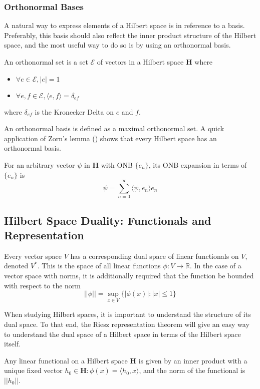 \subsubsection{Orthonormal Bases}
A natural way to express elements of a Hilbert space is in reference to a basis.
Preferably, this basis should also reflect the inner product structure of the
Hilbert space, and the most useful way to do so is by using an orthonormal
basis.

An orthonormal set is a set $\mathscr{E}$ of vectors in a Hilbert space
\textbf{H} where
\begin{itemize}
    \item $\forall e \in \mathscr{E}, |e| = 1$
    \item $\forall e,f \in \mathscr{E}, \langle e,f\rangle = \delta_{ef}$
\end{itemize}
where $\delta_{ef}$ is the Kronecker Delta on $e$ and $f$.

An orthonormal basis is defined as a maximal orthonormal set. A quick
application of Zorn's lemma (\cite[p. 19, 50]{MacCluer2009}) shows that every
Hilbert space has an orthonormal basis.

For an arbitrary vector $\psi$ in \textbf{H} with ONB $\{e_n\}$, its ONB
expansion in terms of $\{e_n\}$ is
\[
    \psi = \sum_{n=0}^{\infty} \langle \psi,e_n \rangle e_n
\]

\subsection{Hilbert Space Duality: Functionals and Representation}
Every vector space $V$ has a corresponding dual space of linear functionals on
$V$, denoted $V^*$. This is the space of all linear functions
$\phi:V\to\mathbb{R}$. In the case of a vector space with norms, it is
additionally required that the function be bounded with respect to the norm
\[
    ||\phi|| = \sup_{x\in V}\{|\phi(x)| : |x| \leq 1\}
\]

When studying Hilbert spaces, it is important to understand the structure of its
dual space. To that end, the Riesz representation theorem will give an easy way
to understand the dual space of a Hilbert space in terms of the Hilbert space
itself.

\begin{theorem}
    Any linear functional on a Hilbert space \textbf{H} is given by an inner
    product with a unique fixed vector $h_0 \in \textbf{H}: \phi(x) =
    \langle h_0, x \rangle$, and the norm of the functional is $||h_0||$.
\end{theorem}
\cite[p. 17]{MacCluer2009}

